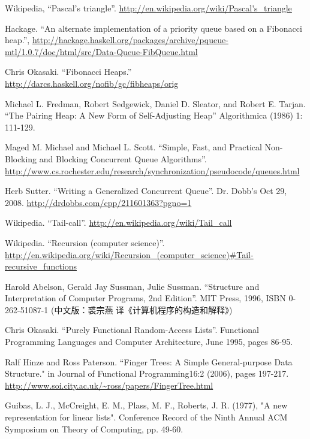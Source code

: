 \documentclass[b5paper]{ctexart}
\begin{document}
\begin{thebibliography}{99}
Wikipedia, ``Pascal's triangle''. \url{http://en.wikipedia.org/wiki/Pascal's_triangle}

Hackage. ``An alternate implementation of a priority queue based on a Fibonacci heap.'', \url{http://hackage.haskell.org/packages/archive/pqueue-mtl/1.0.7/doc/html/src/Data-Queue-FibQueue.html}

Chris Okasaki. ``Fibonacci Heaps.'' \url{http://darcs.haskell.org/nofib/gc/fibheaps/orig}

Michael L. Fredman, Robert Sedgewick, Daniel D. Sleator, and Robert E. Tarjan. ``The Pairing Heap: A New Form of Self-Adjusting Heap'' Algorithmica (1986) 1: 111-129.

Maged M. Michael and Michael L. Scott. ``Simple, Fast, and Practical Non-Blocking and Blocking Concurrent Queue Algorithms''. \url{http://www.cs.rochester.edu/research/synchronization/pseudocode/queues.html}

Herb Sutter. ``Writing a Generalized Concurrent Queue''. Dr. Dobb's Oct 29, 2008. \url{http://drdobbs.com/cpp/211601363?pgno=1}

Wikipedia. ``Tail-call''. \url{http://en.wikipedia.org/wiki/Tail_call}

Wikipedia. ``Recursion (computer science)''. \url{http://en.wikipedia.org/wiki/Recursion_(computer_science)#Tail-recursive_functions}

Harold Abelson, Gerald Jay Sussman, Julie Sussman. ``Structure and Interpretation of Computer Programs, 2nd Edition''. MIT Press, 1996, ISBN 0-262-51087-1 (中文版：裘宗燕 译《计算机程序的构造和解释》)


Chris Okasaki. ``Purely Functional Random-Access Lists''. Functional Programming Languages and Computer Architecture, June 1995, pages 86-95.

Ralf Hinze and Ross Paterson. ``Finger Trees: A Simple General-purpose Data Structure." in Journal of Functional Programming16:2 (2006), pages 197-217. \url{http://www.soi.city.ac.uk/~ross/papers/FingerTree.html}

Guibas, L. J., McCreight, E. M., Plass, M. F., Roberts, J. R. (1977), "A new representation for linear lists". Conference Record of the Ninth Annual ACM Symposium on Theory of Computing, pp. 49-60.


\end{thebibliography}
\end{document}
